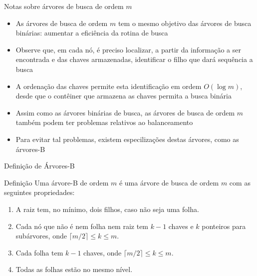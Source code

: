 \begin{frame}[fragile]{Notas sobre árvores de busca de ordem $m$}

	\begin{itemize}
		\item As árvores de busca de ordem $m$ tem o mesmo objetivo das árvores de busca binárias: 
            aumentar a eficiência da rotina de busca

        \item Observe que, em cada nó, é preciso localizar, a partir da informação a ser encontrada
            e das chaves armazenadas, identificar o filho que dará sequência a busca

        \item A ordenação das chaves permite esta identificação em ordem $O(\log m)$, desde que
            o contêiner que armazena as chaves permita a busca binária

		\item Assim como as árvores binárias de busca, as árvores de busca de ordem $m$ 
            também podem ter problemas relativos ao balanceamento

        \item Para evitar tal problemas, existem especilizações destas árvores, como as árvores-B
	\end{itemize}

\end{frame}

\begin{frame}[fragile]{Definição de Árvores-B}

	\begin{block}{Definição}
		Uma árvore-B de ordem $m$ é uma árvore de busca de ordem $m$ com as seguintes propriedades:

		\begin{enumerate}
			\item A raiz tem, no mínimo, dois filhos, caso não seja uma folha.
			\item Cada nó que não é nem folha nem raiz tem $k-1$ chaves e $k$ ponteiros para 
                subárvores, onde $\lceil m/2\rceil \leq k \leq m$.
			\item Cada folha tem $k-1$ chaves, onde $\lceil m/2\rceil \leq k \leq m$.
			\item Todas as folhas estão no mesmo nível.
		\end{enumerate}
	\end{block}

\end{frame} 


